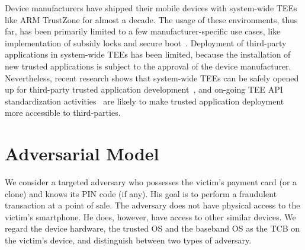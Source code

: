 Device manufacturers have shipped their mobile devices with system-wide TEEs
like ARM TrustZone for almost a decade.  The usage of these environments, thus
far, has been primarily limited to a few manufacturer-specific use cases, like
implementation of subsidy locks and secure boot~\cite{kostiainen2011codaspy}.
Deployment of third-party applications in system-wide TEEs has been limited,
because the installation of new trusted applications is subject to the approval
of the device manufacturer.  Nevertheless, recent research shows that
system-wide TEEs can be safely opened up for third-party trusted application
development~\cite{kostiainen09asiaccs}, and on-going TEE API standardization
activities~\cite{globalplatformspecs} are likely to make trusted application deployment more
accessible to third-parties.

\section{Adversarial Model}
\label{sec:ps_tee_adv}

We consider a targeted adversary who possesses the victim's payment card (or a
clone) and knows its PIN code (if any).  His goal is to perform a fraudulent
transaction at a point of sale.  The adversary does not have physical access to
the victim's smartphone.  He does, however, have access to other similar
devices.  We regard the device hardware, the trusted OS and the baseband OS as
the TCB on the victim's device, and distinguish between two types of adversary.

